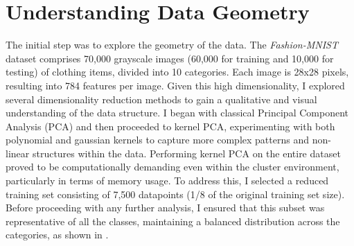 \section{Understanding Data Geometry}\label{data_geometry}

The initial step was to explore the geometry of the data. The \emph{Fashion-MNIST} dataset comprises 70,000 grayscale images 
(60,000 for training and 10,000 for testing) of clothing items, divided into 10 categories. Each image is 28x28 pixels, 
resulting into 784 features per image. Given this high dimensionality, I explored several dimensionality reduction methods to gain 
a qualitative and visual understanding of the data structure. I began with classical Principal Component Analysis (PCA) and then 
proceeded to kernel PCA, experimenting with both polynomial and gaussian kernels to capture more complex patterns and non-linear
structures within the data. Performing kernel PCA on the entire dataset proved to be computationally demanding even within the cluster environment, 
particularly in terms of memory usage. To address this, I selected a reduced training set consisting of 7,500 datapoints (1/8 of the 
original training set size). Before proceeding with any further analysis, I ensured that this subset was representative of all the classes, 
maintaining a balanced distribution across the categories, as shown in .

